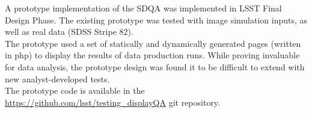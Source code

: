 A prototype implementation of the SDQA was implemented in LSST Final Design Phase. The existing prototype was tested with image simulation inputs, as well as real data (SDSS Stripe 82).
\\

The prototype used a set of statically and dynamically generated pages (written in php) to display the results of data production runs. While proving invaluable for data analysis, the prototype design was found it to be difficult to extend with new analyst-developed tests.
\\

The prototype code is available in the \url{https://github.com/lsst/testing_displayQA} git repository.
